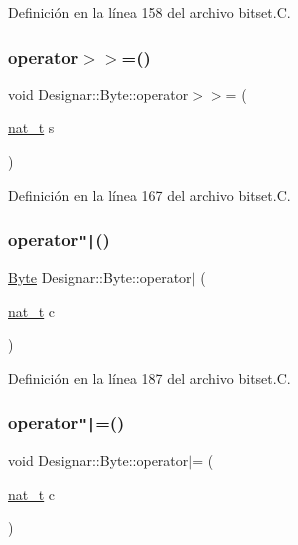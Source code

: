 Definición en la línea 158 del archivo bitset.\+C.

\mbox{\label{class_designar_1_1_byte_a542b9081222051f2d69a29e042602120}} 
\subsubsection{\texorpdfstring{operator$>$$>$=()}{operator>>=()}}
{\footnotesize\ttfamily void Designar\+::\+Byte\+::operator$>$$>$= (\begin{DoxyParamCaption}\item[{\hyperlink{namespace_designar_aa72662848b9f4815e7bf31a7cf3e33d1}{nat\+\_\+t}}]{s }\end{DoxyParamCaption})}



Definición en la línea 167 del archivo bitset.\+C.

\mbox{\label{class_designar_1_1_byte_a968c82b7108fccc2fb035f8b636d4563}} 
\subsubsection{\texorpdfstring{operator\texttt{"|}()}{operator|()}}
{\footnotesize\ttfamily \hyperlink{class_designar_1_1_byte}{Byte} Designar\+::\+Byte\+::operator$\vert$ (\begin{DoxyParamCaption}\item[{\hyperlink{namespace_designar_aa72662848b9f4815e7bf31a7cf3e33d1}{nat\+\_\+t}}]{c }\end{DoxyParamCaption})}



Definición en la línea 187 del archivo bitset.\+C.

\mbox{\label{class_designar_1_1_byte_ae2aed407fc88cfb41c2412cf5852dd30}} 
\subsubsection{\texorpdfstring{operator\texttt{"|}=()}{operator|=()}}
{\footnotesize\ttfamily void Designar\+::\+Byte\+::operator$\vert$= (\begin{DoxyParamCaption}\item[{\hyperlink{namespace_designar_aa72662848b9f4815e7bf31a7cf3e33d1}{nat\+\_\+t}}]{c }\end{DoxyParamCaption})}



